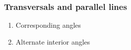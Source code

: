 \documentclass[12pt, oneside]{article}
\begin{document}
\subsubsection*{Transversals and parallel lines}
  \begin{enumerate}
  \item Corresponding angles
  \item Alternate interior angles
  \end{enumerate}
\end{document}
